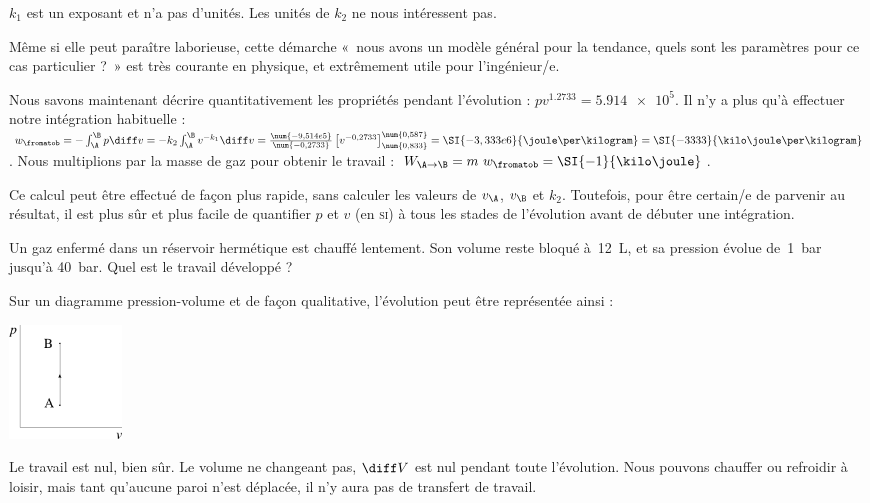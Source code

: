 \begin{anexample}
\begin{answer}
							\begin{remark}$k_1$ est un exposant et n’a pas d’unités. Les unités de $k_2$ ne nous intéressent pas.\end{remark}
							\begin{remark}Même si elle peut paraître laborieuse, cette démarche «~nous avons un modèle général pour la tendance, quels sont les paramètres pour ce cas particulier ?~» est très courante en physique, et extrêmement utile pour l’ingénieur/e.\end{remark}
						Nous savons maintenant décrire quantitativement les propriétés pendant l’évolution : $p v^{\num{1,2733}} = \num{5,914e5}$.	Il n’y a plus qu’à effectuer notre intégration habituelle : $w_\fromatob = - \int_\A^\B p \diff v = - k_2 \int_\A^\B v^{-k_1} \diff v = \frac{\num{-9,514e5}}{\num{-0,2733}} \left[v^{-0,2733}\right]_{\num{0,833}}^{\num{0,587}} = \SI{-3,333e6}{\joule\per\kilogram} = \SI{-3333}{\kilo\joule\per\kilogram}$. Nous multiplions par la masse de gaz pour obtenir le travail : $W_{\A\to\B} = m \ w_\fromatob = \SI{-1}{\kilo\joule}$.
							\begin{remark}Ce calcul peut être effectué de façon plus rapide, sans calculer les valeurs de $v_\A$, $v_\B $ et $k_2$. Toutefois, pour être certain/e de parvenir au résultat, il est plus sûr et plus facile de quantifier $p$ et $v$ (en \textsc{si}) à tous les stades de l’évolution avant de débuter une intégration.\end{remark}
					\end{answer}
			\end{anexample}
			
			\begin{anexample}
				Un gaz enfermé dans un réservoir hermétique est chauffé lentement. Son volume reste bloqué à~\SI{12}{\liter}, et sa pression évolue de~\SI{1}{\bar} jusqu’à \SI{40}{\bar}. Quel est le travail développé ?
					\begin{answer}
						Sur un diagramme pression-volume et de façon qualitative, l’évolution peut être représentée ainsi :
							\begin{center}
								\includegraphics[width=3cm]{images/exe_pv_isochore.png}
							\end{center}
						Le travail est nul, bien sûr. Le volume ne changeant pas, $\diff V$ est nul pendant toute l’évolution. Nous pouvons chauffer ou refroidir à loisir, mais tant qu’aucune paroi n’est déplacée, il n’y aura pas de transfert de travail.
					\end{answer}
			\end{anexample}
			

